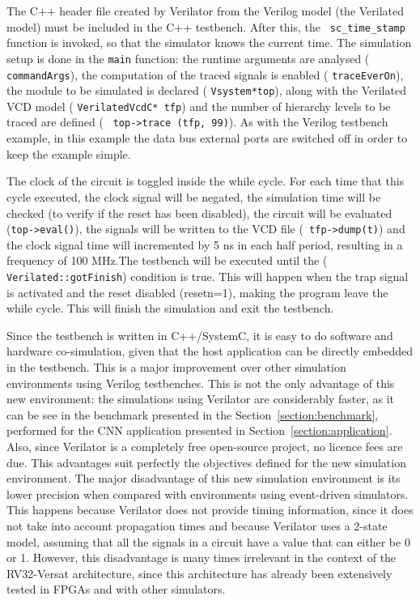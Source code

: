 The C++ header file created by Verilator from the Verilog model (the Verilated
model) must be included in the C++ testbench. After this, the {\tt
  sc\_time\_stamp} function is invoked, so that the simulator knows the current
time. The simulation setup is done in the {\tt main} function: the runtime
arguments are analysed ( {\tt commandArgs}), the computation of the traced
signals is enabled ( {\tt traceEverOn}), the module to be simulated is declared
( {\tt Vsystem*top}), along with the Verilated VCD model ( {\tt VerilatedVcdC*
  tfp}) and the number of hierarchy levels to be traced are defined ( {\tt
  top->trace (tfp, 99)}). As with the Verilog testbench example, in this example
the data bus external ports are switched off in order to keep the example
simple.

The clock of the circuit is toggled inside the while cycle. For each time that
this cycle executed, the clock signal will be negated, the simulation time will
be checked (to verify if the reset has been disabled), the circuit will be
evaluated ({\tt top->eval()}), the signals will be written to the VCD file ({\tt
  tfp->dump(t)}) and the clock signal time will incremented by 5 ns in each half
period, resulting in a frequency of 100 MHz.The testbench will be executed until
the ( {\tt Verilated::gotFinish}) condition is true. This will happen when the
trap signal is activated and the reset disabled (resetn=1), making the program
leave the while cycle. This will finish the simulation and exit the testbench.

Since the testbench is written in C++/SystemC, it is easy to do software and
hardware co-simulation, given that the host application can be directly embedded
in the testbench. This is a major improvement over other simulation environments
using Verilog testbenches. This is not the only advantage of this new
environment: the simulations using Verilator are considerably faster, as it can
be see in the benchmark presented in the Section~\ref{section:benchmark},
performed for the \ac{CNN} application presented in
Section~\ref{section:application}. Also, since Verilator is a completely free
open-source project, no licence fees are due. This advantages suit perfectly the 
objectives defined for the new simulation environment.
The major disadvantage of this new simulation environment is its lower
precision when compared with environments using event-driven simulators. This
happens because Verilator does not provide timing information, since it does not
take into account propagation times and because Verilator uses a 2-state model,
assuming that all the signals in a circuit have a value that can either be 0 or
1.  However, this disadvantage is many times irrelevant in the context of the
RV32-Versat architecture, since this architecture has already been extensively
tested in \ac{FPGA}s and with other simulators.

